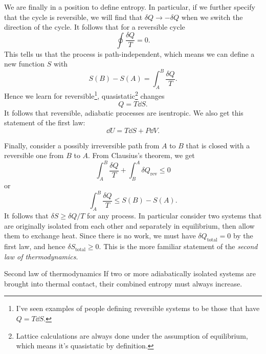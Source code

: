 We are finally in a position to define entropy.
In particular, if we further specify that the cycle is reversible,
we will find that $\delta Q\to-\delta Q$ when we switch the direction of the
cycle. It follows that for a reversible cycle
\begin{equation}
 \oint\frac{\delta Q}{T}=0. 
\end{equation}
This tells us that the process is path-independent, which means we can define a
new function $S$ with
\begin{equation}
 S(B)-S(A)=\int_A^B\frac{\delta Q}{T}. 
\end{equation}
Hence we learn for reversible\footnote{I've seen examples of people defining
reversible systems to be those that have $Q=T\dd S$.}, 
quasistatic\footnote{Lattice calculations are always done under the assumption
of equilibrium, which means it's quasistatic by definition.} changes
\begin{equation}
Q=T\dd S.
\end{equation}
It follows that reversible, adiabatic processes are isentropic.
We also get this statement of the first law:
\begin{equation}
 \dd U = T\dd S+P\dd V.
\end{equation} 

Finally, consider a possibly irreversible path from $A$ to $B$ that is closed
with a reversible one from $B$ to $A$. From Clausius's theorem, we get
\begin{equation}
\int_A^B\frac{\delta Q}{T}+\int_B^A\delta Q_{\text{rev}}\leq0
\end{equation}
or
\begin{equation}
\int_A^B\frac{\delta Q}{T}\leq S(B)-S(A).
\end{equation}
It follows that $\delta S\geq\delta Q/T$ for any process. In particular consider
two systems that are originally isolated from each other and separately in
equilibrium, then allow them to exchange heat. Since there is no work, we must
have $\delta Q_{\text{total}}=0$ by the first law, and hence $\delta
S_{\text{total}}\geq0$. This is the more familiar statement of
the {\it second law of thermodynamics}.
\begin{theorem}{Second law of thermodynamics}{}
If two or more adiabatically isolated systems are brought into thermal contact,
their combined entropy must always increase.
\end{theorem}


